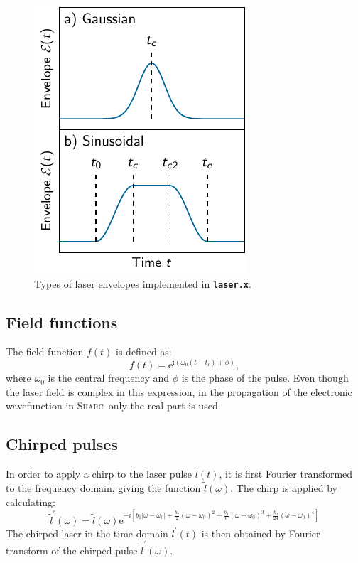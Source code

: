 \documentclass[a4paper,11pt,DIV=15,openany,twoside=false]{scrbook}
\newcommand{\sharc}{\textsc{Sharc}}
\newcommand{\ttt}[1]{\textbf{\texttt{#1}}}
\newcommand{\E}{\ensuremath{\mathrm{e}}}
\newcommand{\I}{\ensuremath{\mathrm{i}}}
\begin{document}
\begin{figure}[h!]
  \centering
  \includegraphics[scale=1]{img/laser_envelope/laser_envelope.pdf}
  \caption{Types of laser envelopes implemented in \ttt{laser.x}.}
  \label{fig:laser_envelope}
\end{figure}

\subsection{Field functions}

The field function $f(t)$ is defined as:
\begin{equation}
  f(t)=\E^{\I \left(\omega_0(t-t_c)+\phi\right)},
\end{equation}
where $\omega_0$ is the central frequency and $\phi$ is the phase of the pulse. Even though the laser field is complex in this expression, in the propagation of the electronic wavefunction in \sharc\ only the real part is used.

\subsection{Chirped pulses}

In order to apply a chirp to the laser pulse $l(t)$, it is first Fourier transformed to the frequency domain, giving the function $\tilde{l}(\omega)$. The chirp is applied by calculating:
\begin{equation}
  \tilde{l}^\prime(\omega)=
  \tilde{l}(\omega)
  \E^{-i\left[
  b_1|\omega-\omega_0|
  +\frac{b_2}{2}(\omega-\omega_0)^2
  +\frac{b_3}{6}(\omega-\omega_0)^3
  +\frac{b_4}{24}(\omega-\omega_0)^4
  \right]}\label{eq:laser_chirp}
\end{equation}
The chirped laser in the time domain $l^\prime(t)$ is then obtained by Fourier transform of the chirped pulse $\tilde{l}^\prime(\omega)$.
\end{document}
